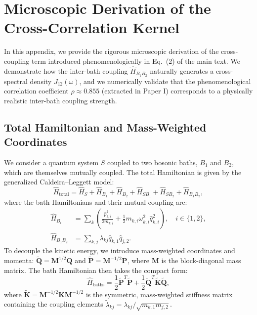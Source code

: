 \appendix

\section{Microscopic Derivation of the Cross-Correlation Kernel}
\label{app:microscopic_derivation}

In this appendix, we provide the rigorous microscopic derivation of the cross-coupling term introduced phenomenologically in Eq.~(2) of the main text. We demonstrate how the inter-bath coupling $\hat{H}_{B_1 B_2}$ naturally generates a cross-spectral density $J_{12}(\omega)$, and we numerically validate that the phenomenological correlation coefficient $\rho \approx 0.855$ (extracted in Paper I) corresponds to a physically realistic inter-bath coupling strength.

\subsection{Total Hamiltonian and Mass-Weighted Coordinates}
We consider a quantum system $S$ coupled to two bosonic baths, $B_1$ and $B_2$, which are themselves mutually coupled. The total Hamiltonian is given by the generalized Caldeira--Leggett model:
\begin{equation}
\hat{H}_{\text{total}} = \hat{H}_S + \hat{H}_{B_1} + \hat{H}_{B_2} + \hat{H}_{SB_1} + \hat{H}_{SB_2} + \hat{H}_{B_1 B_2},
\label{eq:H_total}
\end{equation}
where the bath Hamiltonians and their mutual coupling are:
\begin{align}
\hat{H}_{B_i} &= \sum_{k} \left( \frac{\hat{p}_{k,i}^2}{2m_{k,i}} + \frac{1}{2} m_{k,i} \omega_{k,i}^2 \hat{q}_{k,i}^2 \right), \quad i \in \{1, 2\}, \\
\hat{H}_{B_1 B_2} &= \sum_{k,j} \lambda_{kj} \hat{q}_{k,1} \hat{q}_{j,2}.
\label{eq:H_bath_coupling}
\end{align}
To decouple the kinetic energy, we introduce mass-weighted coordinates and momenta: $\tilde{\mathbf{Q}} = \mathbf{M}^{1/2} \mathbf{Q}$ and $\tilde{\mathbf{P}} = \mathbf{M}^{-1/2} \mathbf{P}$, where $\mathbf{M}$ is the block-diagonal mass matrix. The bath Hamiltonian then takes the compact form:
\begin{equation}
\hat{H}_{\text{baths}} = \frac{1}{2} \tilde{\mathbf{P}}^T \tilde{\mathbf{P}} + \frac{1}{2} \tilde{\mathbf{Q}}^T \tilde{\mathbf{K}} \tilde{\mathbf{Q}},
\label{eq:H_mass_weighted}
\end{equation}
where $\tilde{\mathbf{K}} = \mathbf{M}^{-1/2} \mathbf{K} \mathbf{M}^{-1/2}$ is the symmetric, mass-weighted stiffness matrix containing the coupling elements $\tilde{\lambda}_{kj} = \lambda_{kj} / \sqrt{m_{k,1} m_{j,2}}$.

